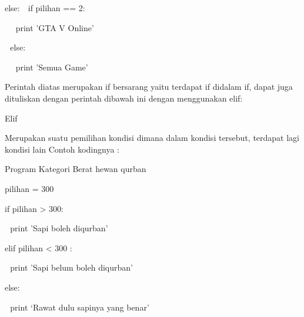 \vspace{\baselineskip}
else:\vspace{\baselineskip}
 $  $  $  $ if pilihan == 2: \par
\noindent 
\vspace{\baselineskip}
 $  $  $  $  $  $  $  $ print 'GTA V Online' \par
\noindent 
\vspace{\baselineskip}
 $  $  $  $ else: \par
\noindent 
\vspace{\baselineskip}
 $  $  $  $  $  $  $  $ print 'Semua Game' \par
\noindent 
\vspace{\baselineskip}
Perintah diatas merupakan if bersarang yaitu terdapat if didalam if, dapat juga dituliskan dengan perintah dibawah ini dengan menggunakan elif: \par
\noindent 
\vspace{\baselineskip}
\vspace{\baselineskip}
Elif \par
\noindent 
\vspace{\baselineskip}
Merupakan suatu pemilihan kondisi dimana dalam kondisi tersebut, terdapat lagi kondisi lain\vspace{\baselineskip}
Contoh kodingnya : \par
\noindent 
\vspace{\baselineskip}
Program Kategori Berat hewan qurban \par
\noindent 
\vspace{\baselineskip}
pilihan = 300 \par
\noindent 
\vspace{\baselineskip}
if pilihan > 300: \par
\noindent 
\vspace{\baselineskip}
 $  $  $  $ print 'Sapi boleh diqurban' \par
\noindent 
\vspace{\baselineskip}
elif pilihan <  $  $300 : \par
\noindent 
\vspace{\baselineskip}
 $  $  $  $ print 'Sapi belum boleh diqurban' \par
\noindent 
\vspace{\baselineskip}
else: \par
\noindent 
\vspace{\baselineskip}
 $  $  $  $ print ‘Rawat dulu sapinya yang benar' \par
\noindent 

